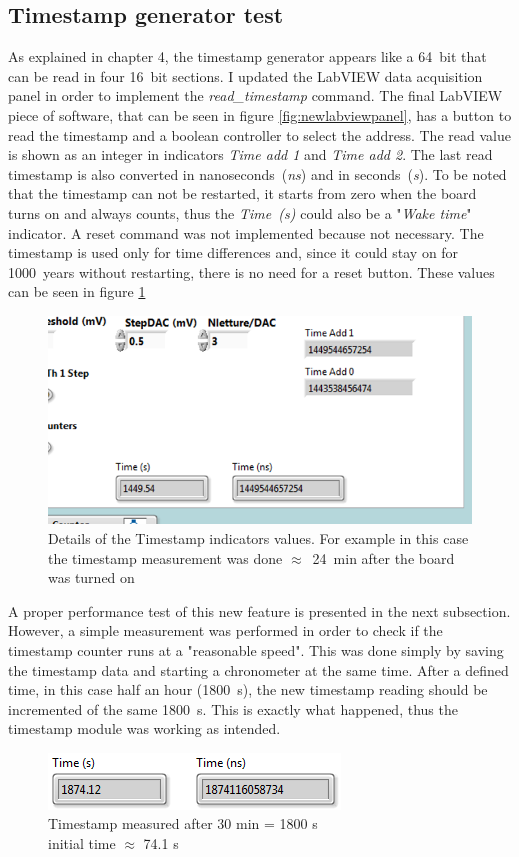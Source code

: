 \subsection{Timestamp generator test}
\noindent As explained in chapter 4, the timestamp generator appears like a 64~bit that can be read in four 16~bit sections.
I updated the LabVIEW data acquisition panel in order to implement the \textit{read\_timestamp} command.
The final LabVIEW piece of software, that can be seen in figure \ref{fig:newlabviewpanel}, has a button to read the timestamp and a boolean controller to select the address.
The read value is shown as an integer in indicators \textit{Time add 1} and \textit{Time add 2}. The last read timestamp is also converted in nanoseconds~(\textit{ns}) and in seconds~(\textit{s}).
To be noted that the timestamp can not be restarted, it starts from zero when the board turns on and always counts, thus the \textit{Time~(s)} could also be a "\textit{Wake time}" indicator. A reset command was not implemented because not necessary. The timestamp is used only for time differences and, since it could stay on for 1000~years without restarting, there is no need for a reset button. 
These values can be seen in figure \ref{fig:timestampfigure}
\begin{figure}[H]
	\centering
	\includegraphics[width=0.5\linewidth]{IMG/ch5/latch_tests/fig15.PNG}
	\caption{Details of the Timestamp indicators values. For example in this case the timestamp measurement was done $\approx$~24~min after the board was turned on}
	\label{fig:timestampfigure}
\end{figure}
\noindent A proper performance test of this new feature is presented in the next subsection. However, a simple measurement was performed in order to check if the timestamp counter runs at a "reasonable speed".
This was done simply by saving the timestamp data and starting a chronometer at the same time. After a defined time, in this case half an hour (1800~s), the new timestamp reading should be incremented of the same 1800~s.
This is exactly what happened, thus the timestamp module was working as intended.  
\begin{figure}[H]
	\centering
	\includegraphics[width=0.35\linewidth]{IMG/ch5/latch_tests/fig20.PNG}
	\caption{Timestamp measured after 30 min = 1800 s\\initial time $\approx$ 74.1 s}
	\label{fig:timestamptest}
\end{figure}

